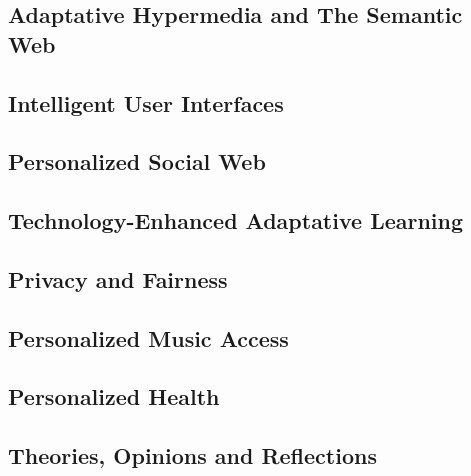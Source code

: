 \documentclass[12pt]{article}
\begin{document}
\subsection{Adaptative Hypermedia and The Semantic Web}
\subsection{Intelligent User Interfaces}
\subsection{Personalized Social Web}
\subsection{Technology-Enhanced Adaptative Learning}
\subsection{Privacy and Fairness}
\subsection{Personalized Music Access}
\subsection{Personalized Health}
\subsection{Theories, Opinions and Reflections}
\newpage


\end{document}

